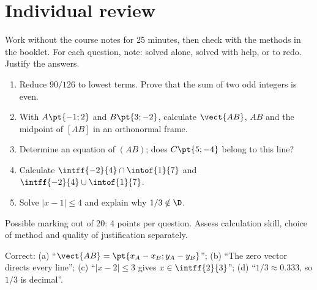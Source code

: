 \section{Individual review}
\begin{method}[Instructions]
Work without the course notes for 25 minutes, then check with the methods in the booklet. For each question, note: solved alone, solved with help, or to redo. Justify the answers.
\end{method}
\begin{example}\begin{enumerate}
\item Reduce $90/126$ to lowest terms. Prove that the sum of two odd integers is even.
\item With $A\pt{-1;2}$ and $B\pt{3;-2}$, calculate $\vect{AB}$, $AB$ and the midpoint of $[AB]$ in an orthonormal frame.
\item Determine an equation of $(AB)$; does $C\pt{5;-4}$ belong to this line?
\item Calculate $\intff{-2}{4}\cap\intof{1}{7}$ and $\intff{-2}{4}\cup\intof{1}{7}$.
\item Solve $|x-1|\leq4$ and explain why $1/3\notin\D$.
\end{enumerate}\end{example}
\begin{teachernote}Possible marking out of 20: 4 points per question. Assess calculation skill, choice of method and quality of justification separately.\end{teachernote}
\begin{example}Correct: (a) ``$\vect{AB}=\pt{x_A-x_B;y_A-y_B}$''; (b) ``The zero vector directs every line''; (c) ``$|x-2|\leq3$ gives $x\in\intff{2}{3}$''; (d) ``$1/3\approx\num{0,333}$, so $1/3$ is decimal''.\end{example}
